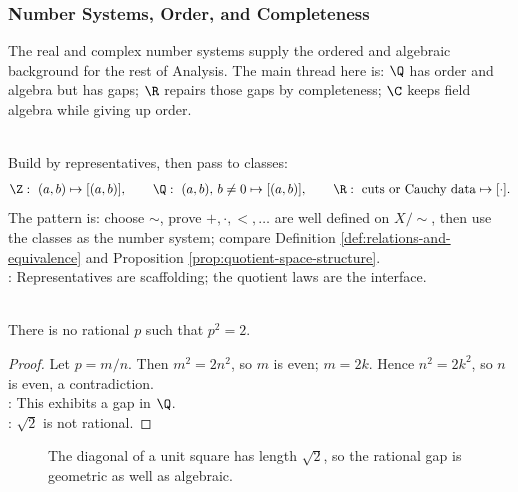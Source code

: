 \subsubsection{Number Systems, Order, and Completeness}


The real and complex number systems supply the ordered and algebraic background for the rest of Analysis. The main thread here is: $\Q$ has order and algebra but has gaps; $\R$ repairs those gaps by completeness; $\C$ keeps field algebra while giving up order.

\begin{perspective} \label{per:number-systems-from-representatives} \\
Build by representatives, then pass to classes:
\begin{align}
\Z:\ (a,b)\mapsto[(a,b)],\qquad
\Q:\ (a,b),\,b\neq0\mapsto[(a,b)],\qquad
\R:\ \text{cuts or Cauchy data}\mapsto[\cdot]. \nonumber
\end{align}
The pattern is: choose $\sim$, prove $+,\cdot,<,\ldots$ are well defined on $X/{\sim}$, then use the classes as the number system; compare Definition \ref{def:relations-and-equivalence} and Proposition \ref{prop:quotient-space-structure}.\\
: Representatives are scaffolding; the quotient laws are the interface.
\end{perspective}

\begin{proposition} \label{prop:rational-square-root-two-gap} \\
There is no rational $p$ such that $p^2=2$.
\begin{proof} Let $p=m/n$. Then $m^2=2n^2$, so $m$ is even; $m=2k$. Hence $n^2=2k^2$, so $n$ is even, a contradiction.\\
: This exhibits a gap in $\Q$.\\
: $\sqrt{2}$ is not rational.
\end{proof}
\end{proposition}

\begin{figure}[H]
  \centering
  
  \caption{The diagonal of a unit square has length $\sqrt{2}$, so the rational gap is geometric as well as algebraic.}
  \label{fig:unit-square-sqrt-two}
\end{figure}

